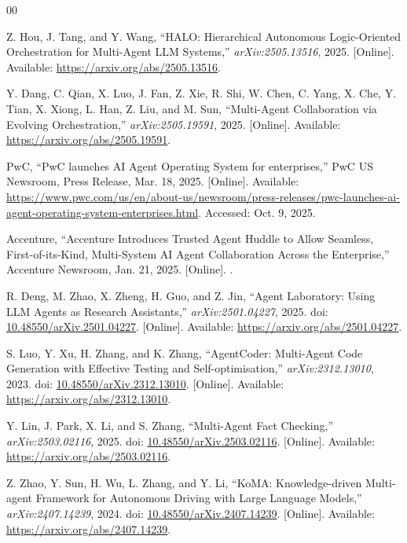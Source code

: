 \documentclass[conference]{IEEEtran}
\begin{document}
\begin{thebibliography}{00}

Z. Hou, J. Tang, and Y. Wang, ``HALO: Hierarchical Autonomous Logic-Oriented Orchestration for Multi-Agent LLM Systems,'' \emph{arXiv:2505.13516}, 2025. [Online]. Available: \url{https://arxiv.org/abs/2505.13516}.

Y. Dang, C. Qian, X. Luo, J. Fan, Z. Xie, R. Shi, W. Chen, C. Yang, X. Che, Y. Tian, X. Xiong, L. Han, Z. Liu, and M. Sun, ``Multi-Agent Collaboration via Evolving Orchestration,'' \emph{arXiv:2505.19591}, 2025. [Online]. Available: \url{https://arxiv.org/abs/2505.19591}.

PwC, ``PwC launches AI Agent Operating System for enterprises,'' PwC US Newsroom, Press Release, Mar. 18, 2025. [Online]. Available: \url{https://www.pwc.com/us/en/about-us/newsroom/press-releases/pwc-launches-ai-agent-operating-system-enterprises.html}. Accessed: Oct. 9, 2025.

Accenture, ``Accenture Introduces Trusted Agent Huddle to Allow Seamless, First-of-its-Kind, Multi-System AI Agent Collaboration Across the Enterprise,'' Accenture Newsroom, Jan. 21, 2025. [Online]. .


R. Deng, M. Zhao, X. Zheng, H. Guo, and Z. Jin, ``Agent Laboratory: Using LLM Agents as Research Assistants,'' \emph{arXiv:2501.04227}, 2025. doi: \href{https://doi.org/10.48550/arXiv.2501.04227}{10.48550/arXiv.2501.04227}. [Online]. Available: \url{https://arxiv.org/abs/2501.04227}.

S. Luo, Y. Xu, H. Zhang, and K. Zhang, ``AgentCoder: Multi-Agent Code Generation with Effective Testing and Self-optimisation,'' \emph{arXiv:2312.13010}, 2023. doi: \href{https://doi.org/10.48550/arXiv.2312.13010}{10.48550/arXiv.2312.13010}. [Online]. Available: \url{https://arxiv.org/abs/2312.13010}.

Y. Lin, J. Park, X. Li, and S. Zhang, ``Multi-Agent Fact Checking,'' \emph{arXiv:2503.02116}, 2025. doi: \href{https://doi.org/10.48550/arXiv.2503.02116}{10.48550/arXiv.2503.02116}. [Online]. Available: \url{https://arxiv.org/abs/2503.02116}.

Z. Zhao, Y. Sun, H. Wu, L. Zhang, and Y. Li, ``KoMA: Knowledge-driven Multi-agent Framework for Autonomous Driving with Large Language Models,'' \emph{arXiv:2407.14239}, 2024. doi: \href{https://doi.org/10.48550/arXiv.2407.14239}{10.48550/arXiv.2407.14239}. [Online]. Available: \url{https://arxiv.org/abs/2407.14239}.


\end{thebibliography}
\end{document}
